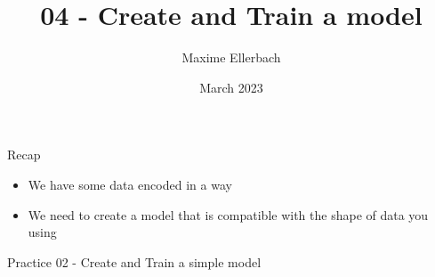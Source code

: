 \documentclass{beamer}
\title{04 - Create and Train a model}
\author{Maxime Ellerbach}
\date{March 2023}
\begin{document}
\begin{frame}
    \titlepage
\end{frame}

\begin{frame}{Recap}
    \begin{itemize}
        \item We have some data encoded in a way
        \item We need to create a model that is compatible with the shape of data you using
    \end{itemize}
\end{frame}

\begin{frame}{Practice 02 - Create and Train a simple model}
    
\end{frame}
\end{document}

